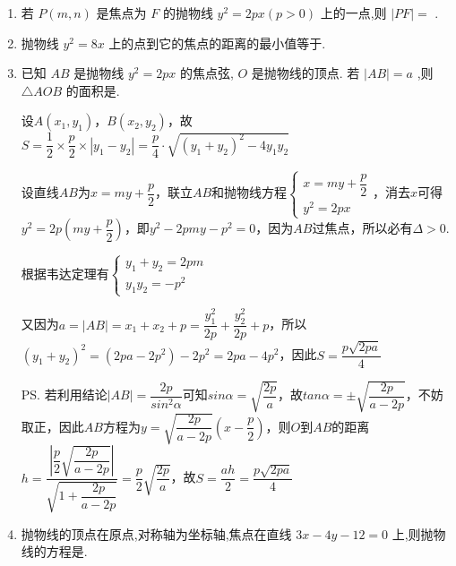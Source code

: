 \begin{enumerate}
    \item 若 $P\left( {m,n}\right)$ 是焦点为 $F$ 的抛物线 ${y}^{2} = {2px}\left( {p > 0}\right)$ 上的一点,则 $\left| {PF}\right|  =$ . 
    
    \item 抛物线 ${y}^{2} = {8x}$ 上的点到它的焦点的距离的最小值等于.

    \item 已知 ${AB}$ 是抛物线 ${y}^{2} = {2px}$ 的焦点弦, $O$ 是抛物线的顶点. 若 $\left| {AB}\right|  = a$ ,则 $\bigtriangleup  {AOB}$ 的面积是.
    \begin{jieda}
        设$A(x_1, y_1)$，$B(x_2, y_2)$，故$S = \dfrac{1}{2} \times \dfrac{p}{2} \times |y_1-y_2| = \dfrac{p}{4}\cdot \sqrt{(y_1+y_2)^2-4y_1y_2}$

        设直线$AB$为$x = my+\dfrac{p}{2}$，联立$AB$和抛物线方程$\left\{\begin{array}{l}
             x = my+\dfrac{p}{2}  \\
             y^2= 2px
        \end{array}\right.$，消去$x$可得$y^2= 2p\left(my+\dfrac{p}{2}\right)$，即$y^2 - 2pmy - p^2 = 0$，因为$AB$过焦点，所以必有$\Delta > 0$.

        根据韦达定理有$\left\{\begin{array}{l}
             y_1+y_2 = 2pm \\
             y_1y_2 = -p^2
        \end{array}\right.$

        又因为$a = |AB| = x_1+x_2+p = \dfrac{y_1^2}{2p} + \dfrac{y_2^2}{2p}+p$，所以$(y_1+y_2)^2 = (2pa-2p^2) -2p^2 = 2pa - 4p^2$，因此$S = \dfrac{p\sqrt{2pa}}{4}$

        \ps 若利用结论$|AB| = \dfrac{2p}{sin^2\alpha}$可知$sin\alpha = \sqrt{\dfrac{2p}{a}}$，故$tan\alpha = \pm \sqrt{\dfrac{2p}{a-2p}}$，不妨取正，因此$AB$方程为$y = \sqrt{\dfrac{2p}{a-2p}}\left(x-\dfrac{p}{2}\right)$，则$O$到$AB$的距离$h = \dfrac{\left|\dfrac{p}{2}\sqrt{\dfrac{2p}{a-2p}}\right|}{\sqrt{1+\dfrac{2p}{a-2p}}} = \dfrac{p}{2}\sqrt{\dfrac{2p}{a}}$，故$S = \dfrac{ah}{2} = \dfrac{p\sqrt{2pa}}{4}$
    \end{jieda}

    \item 抛物线的顶点在原点,对称轴为坐标轴,焦点在直线 ${3x} - {4y} - {12} = 0$ 上,则抛物线的方程是.
    \begin{jieda}
    \end{jieda}


\end{enumerate}
